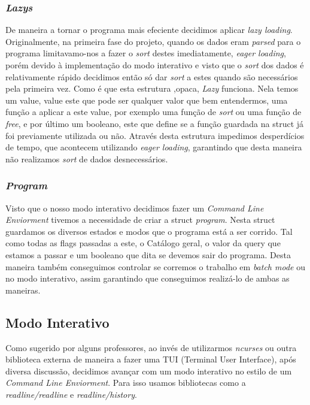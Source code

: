 \documentclass{article}
\begin{document}
        \subsubsection{\emph{Lazys}}
            De maneira a tornar o programa mais efeciente decidimos aplicar 
            \emph{lazy loading}. Originalmente, na primeira fase do projeto,
            quando os dados eram \emph{parsed} para o programa limitavamo-nos a 
            fazer o \emph{sort} destes imediatamente, \emph{eager loading}, porém devido à 
            implementação do modo interativo e visto que o \emph{sort} dos dados é relativamente 
            rápido decidimos então só dar \emph{sort} a estes quando são necessários pela primeira 
            vez. Como é que esta estrutura ,opaca, \emph{Lazy} funciona. Nela temos um value, value 
            este que pode ser qualquer valor que bem entendermos, uma função a aplicar a este value, 
            por exemplo uma função de \emph{sort} ou uma função de \emph{free}, e por último um booleano, 
            este que define se a função guardada na struct já foi previamente utilizada ou não. 
            Através desta estrutura impedimos desperdícios de tempo, que acontecem utilizando 
            \emph{eager loading}, garantindo que desta maneira não realizamos \emph{sort} de dados 
            desnecessários.
        \subsubsection{\emph{Program}}
            Visto que o nosso modo interativo decidimos fazer um \emph{Command Line Enviorment} tivemos
            a necessidade de criar a struct \emph{program}. Nesta struct guardamos os diversos estados e
            modos que o programa está a ser corrido. Tal como todas as flags passadas a este, o Catálogo 
            geral, o valor da query que estamos a passar e um booleano que dita se devemos sair do programa.
            Desta maneira também conseguimos controlar se corremos o trabalho em \emph{batch mode} ou no 
            modo interativo, assim garantindo que conseguimos realizá-lo de ambas as maneiras.
    \subsection{Modo Interativo}
            Como sugerido por alguns professores, ao invés de utilizarmos \emph{ncurses} ou outra 
            biblioteca externa de maneira a fazer uma TUI (Terminal User Interface), após diversa 
            discussão, decidimos avançar com um modo interativo no estilo de um \emph{Command Line 
            Enviorment}. Para isso usamos bibliotecas como a \emph{readline/readline} e 
            \emph{readline/history}. 
\end{document}
